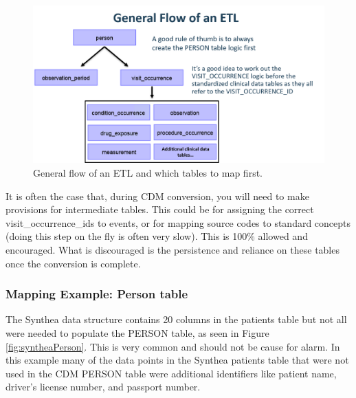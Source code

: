\documentclass[11pt]{book}
\theoremstyle{definition}
\theoremstyle{definition}
\theoremstyle{definition}
\theoremstyle{remark}
\begin{document}
\begin{figure}
\includegraphics[width=1\linewidth]{images/ExtractTransformLoad/flowOfEtl} \caption{General flow of an ETL and which tables to map first.}\label{fig:etlFlow}
\end{figure}

It is often the case that, during CDM conversion, you will need to make provisions for intermediate tables. This could be for assigning the correct visit\_occurrence\_ids to events, or for mapping source codes to standard concepts (doing this step on the fly is often very slow). This is 100\% allowed and encouraged. What is discouraged is the persistence and reliance on these tables once the conversion is complete.

\hypertarget{mapping-example-person-table}{%
\subsubsection{Mapping Example: Person table}\label{mapping-example-person-table}}

The Synthea data structure contains 20 columns in the patients table but not all were needed to populate the PERSON table, as seen in Figure \ref{fig:syntheaPerson}. This is very common and should not be cause for alarm. In this example many of the data points in the Synthea patients table that were not used in the CDM PERSON table were additional identifiers like patient name, driver's license number, and passport number.
\end{document}
